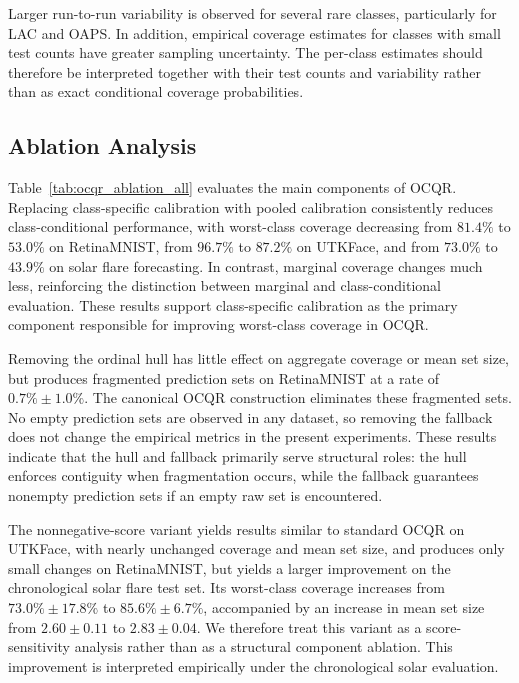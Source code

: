 \documentclass[conference]{IEEEtran}
\begin{document}
Larger run-to-run variability is observed for several rare classes, particularly for LAC and OAPS. In addition, empirical coverage estimates for classes with small test counts have greater sampling uncertainty. The per-class estimates should therefore be interpreted together with their test counts and variability rather than as exact conditional coverage probabilities.

\subsection{Ablation Analysis}
Table~\ref{tab:ocqr_ablation_all} evaluates the main components of OCQR. Replacing class-specific calibration with pooled calibration consistently reduces class-conditional performance, with worst-class coverage decreasing from \(81.4\%\) to \(53.0\%\) on RetinaMNIST, from \(96.7\%\) to \(87.2\%\) on UTKFace, and from \(73.0\%\) to \(43.9\%\) on solar flare forecasting. In contrast, marginal coverage changes much less, reinforcing the distinction between marginal and class-conditional evaluation. These results support class-specific calibration as the primary component responsible for improving worst-class coverage in OCQR.

Removing the ordinal hull has little effect on aggregate coverage or mean set size, but produces fragmented prediction sets on RetinaMNIST at a rate of \(0.7\%\pm1.0\%\). The canonical OCQR construction eliminates these fragmented sets. No empty prediction sets are observed in any dataset, so removing the fallback does not change the empirical metrics in the present experiments. These results indicate that the hull and fallback primarily serve structural roles: the hull enforces contiguity when fragmentation occurs, while the fallback guarantees nonempty prediction sets if an empty raw set is encountered.

The nonnegative-score variant yields results similar to standard OCQR on UTKFace, with nearly unchanged coverage and mean set size, and produces only small changes on RetinaMNIST, but yields a larger improvement on the chronological solar flare test set. Its worst-class coverage increases from \(73.0\%\pm17.8\%\) to \(85.6\%\pm6.7\%\), accompanied by an increase in mean set size from \(2.60\pm0.11\) to \(2.83\pm0.04\). We therefore treat this variant as a score-sensitivity analysis rather than as a structural component ablation. This improvement is interpreted empirically under the chronological solar evaluation.
\end{document}
